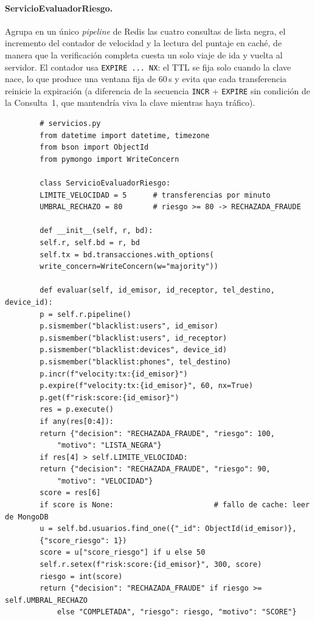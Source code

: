 \documentclass[11pt,a4paper]{article}
\begin{document}
	\paragraph{ServicioEvaluadorRiesgo.} Agrupa en un único \textit{pipeline} de Redis las cuatro consultas de lista negra, el incremento del contador de velocidad y la lectura del puntaje en caché, de manera que la verificación completa cuesta un solo viaje de ida y vuelta al servidor. El contador usa \texttt{EXPIRE ... NX}: el TTL se fija solo cuando la clave nace, lo que produce una ventana fija de 60\,s y evita que cada transferencia reinicie la expiración (a diferencia de la secuencia \texttt{INCR} + \texttt{EXPIRE} sin condición de la Consulta~1, que mantendría viva la clave mientras haya tráfico).
	
	\begin{lstlisting}
		# servicios.py
		from datetime import datetime, timezone
		from bson import ObjectId
		from pymongo import WriteConcern
		
		class ServicioEvaluadorRiesgo:
		LIMITE_VELOCIDAD = 5      # transferencias por minuto
		UMBRAL_RECHAZO = 80       # riesgo >= 80 -> RECHAZADA_FRAUDE
		
		def __init__(self, r, bd):
		self.r, self.bd = r, bd
		self.tx = bd.transacciones.with_options(
		write_concern=WriteConcern(w="majority"))
		
		def evaluar(self, id_emisor, id_receptor, tel_destino, device_id):
		p = self.r.pipeline()
		p.sismember("blacklist:users", id_emisor)
		p.sismember("blacklist:users", id_receptor)
		p.sismember("blacklist:devices", device_id)
		p.sismember("blacklist:phones", tel_destino)
		p.incr(f"velocity:tx:{id_emisor}")
		p.expire(f"velocity:tx:{id_emisor}", 60, nx=True)
		p.get(f"risk:score:{id_emisor}")
		res = p.execute()
		if any(res[0:4]):
		return {"decision": "RECHAZADA_FRAUDE", "riesgo": 100,
			"motivo": "LISTA_NEGRA"}
		if res[4] > self.LIMITE_VELOCIDAD:
		return {"decision": "RECHAZADA_FRAUDE", "riesgo": 90,
			"motivo": "VELOCIDAD"}
		score = res[6]
		if score is None:                       # fallo de cache: leer de MongoDB
		u = self.bd.usuarios.find_one({"_id": ObjectId(id_emisor)},
		{"score_riesgo": 1})
		score = u["score_riesgo"] if u else 50
		self.r.setex(f"risk:score:{id_emisor}", 300, score)
		riesgo = int(score)
		return {"decision": "RECHAZADA_FRAUDE" if riesgo >= self.UMBRAL_RECHAZO
			else "COMPLETADA", "riesgo": riesgo, "motivo": "SCORE"}
		

\end{lstlisting}
\end{document}
